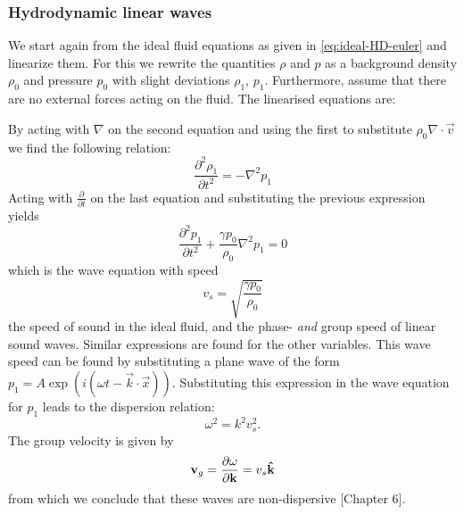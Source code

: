 \subsubsection{Hydrodynamic linear waves}
We start again from the ideal fluid equations as given in \cref{eq:ideal-HD-euler} and linearize them.
For this we rewrite the quantities $\rho$ and $p$ as a background density $\rho_0$ and pressure $p_0$ with slight deviations $\rho_1$, $p_1$.
Furthermore, assume that there are no external forces acting on the fluid. The linearised equations are:

{\centering 
\noindent {}
\par}
By acting with $\nabla$ on the second equation and using the first to substitute $\rho_0 \nabla \cdot \vec{v}$ we find the following relation:
\begin{equation*}
	\frac{\partial^2 \rho_1}{\partial t^2} = -\nabla^2 p_1
\end{equation*}
Acting with $ \frac{\partial}{\partial t}$ on the last equation and substituting the previous expression yields
\begin{equation*}
	\frac{\partial^2 p_1}{\partial t^2} + \frac{\gamma p_0}{\rho_0} \nabla^2 p_1 = 0
\end{equation*}
which is the wave equation with speed
\begin{equation}
v_s = \sqrt{ \frac{\gamma p_0}{\rho_0} }
\label{eq:sound-speed}
\end{equation}
the speed of sound in the ideal fluid, and the phase- \textit{and} group speed of linear sound waves.
Similar expressions are found for the other variables. This wave speed can be found by substituting a plane wave of the form $p_1 = A \exp \left( i(\omega t - \vec{k}\cdot\vec{x}) \right) $. Substituting this expression in the wave equation for $p_1$ leads to the dispersion relation:
\begin{equation}
	\omega^2 = k^2v_s^2.
\end{equation}
The group velocity is given by
\begin{equation}
	\mathbf{v}_{g} = \frac{\partial \omega}{\partial \mathbf{k}} = v_s\mathbf{\hat{k}}
	\label{eq:group-velocity}
\end{equation}
from which we conclude that these waves are non-dispersive \cite{notes-fluid-dynamics}[Chapter 6].

